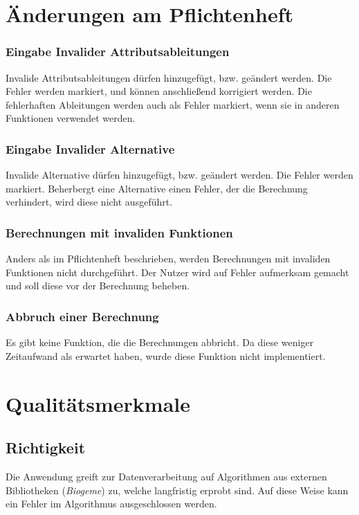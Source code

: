 \documentclass{article}
\begin{document}
\newpage
\section{Änderungen am Pflichtenheft}

\subsubsection*{Eingabe Invalider Attributsableitungen}
Invalide Attributsableitungen dürfen hinzugefügt, bzw. geändert werden. Die Fehler werden markiert, und können anschließend korrigiert werden. Die fehlerhaften Ableitungen werden auch als Fehler markiert, wenn sie in anderen Funktionen verwendet werden.

\subsubsection*{Eingabe Invalider Alternative}
Invalide Alternative dürfen hinzugefügt, bzw. geändert werden. Die Fehler werden markiert. Beherbergt eine Alternative einen Fehler, der die Berechnung verhindert, wird diese nicht ausgeführt.

\subsubsection*{Berechnungen mit invaliden Funktionen}
Anders als im Pflichtenheft beschrieben, werden Berechnungen mit invaliden Funktionen nicht durchgeführt. Der Nutzer wird auf Fehler aufmerksam gemacht und soll diese vor der Berechnung beheben.

\subsubsection*{Abbruch einer Berechnung}
Es gibt keine Funktion, die die Berechnungen abbricht. Da diese weniger Zeitaufwand als erwartet haben, wurde diese Funktion nicht implementiert.

\newpage
\section{Qualitätsmerkmale}

\subsection{Richtigkeit}

Die Anwendung greift zur Datenverarbeitung auf Algorithmen aus externen Bibliotheken (\emph{Biogeme}) zu, welche langfristig erprobt sind. Auf diese Weise kann ein Fehler im Algorithmus ausgeschlossen werden.\\
\end{document}
